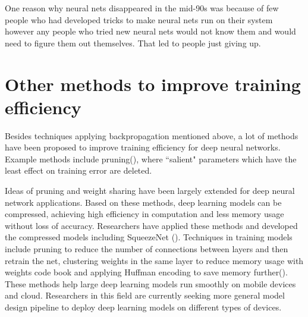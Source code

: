 {\centering{}\par}
\vspace{5pt}

One reason why neural nets disappeared in the mid-90s was because of few people who had developed tricks to make neural nets run on their system however any people who tried new neural nets would not know them and would need to figure them out themselves. 
That led to people just giving up. 

\section{Other methods to improve training efficiency}

Besides techniques applying backpropagation mentioned above, a lot of methods have been proposed to improve training efficiency for deep neural networks. Example methods include pruning(\cite{lecun1990optimal}), where ``salient" parameters which have the least effect on training error are deleted.

Ideas of pruning and weight sharing have been largely extended for deep neural network applications. Based on these methods, deep learning models can be compressed, achieving high efficiency in computation and less memory usage without loss of accuracy.  Researchers have applied these methods and developed the compressed models including SqueezeNet (\cite{iandola2016squeezenet}). Techniques in training models include pruning to reduce the number of connections between layers and then retrain the net, clustering weights in the same layer to reduce memory usage with weights code book and applying Huffman encoding to save memory further(\cite{han2015deep}). These methods help large deep learning models run smoothly on mobile devices and cloud. Researchers in this field are currently seeking more general model design pipeline to deploy deep learning models on different types of devices.

